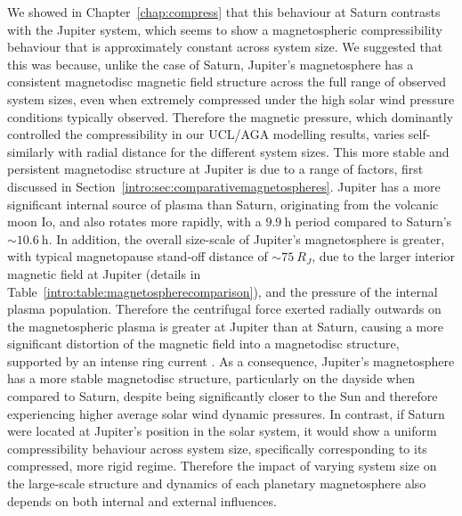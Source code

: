 We showed in Chapter~\ref{chap:compress} that this behaviour at Saturn contrasts with the Jupiter system, which seems to show a magnetospheric compressibility behaviour that is approximately constant across system size. We suggested that this was because, unlike the case of Saturn, Jupiter's magnetosphere has a consistent magnetodisc magnetic field structure across the full range of observed system sizes, even when extremely compressed under the high solar wind pressure conditions typically observed. Therefore the magnetic pressure, which dominantly controlled the compressibility in our UCL/AGA modelling results, varies self-similarly with radial distance for the different system sizes. This more stable and persistent magnetodisc structure at Jupiter is due to a range of factors, first discussed in Section~\ref{intro:sec:comparativemagnetospheres}. Jupiter has a more significant internal source of plasma than Saturn, originating from the volcanic moon Io, and also rotates more rapidly, with a $\SI{9.9}{\hour}$ period compared to Saturn's  ${\sim}\SI{10.6}{\hour}$. In addition, the overall size-scale of Jupiter's magnetosphere is  greater, with typical magnetopause stand-off distance of ${\sim}\SI{75}{R_J}$, due to the larger interior magnetic field at Jupiter (details in Table~\ref{intro:table:magnetospherecomparison}), and the pressure of the internal plasma population. Therefore the centrifugal force exerted radially outwards on the magnetospheric plasma is greater at Jupiter than at Saturn, causing a more significant distortion of the magnetic field into a magnetodisc structure, supported by an intense ring current \citep[e.g.][]{khurana2004}. As a consequence, Jupiter's magnetosphere has a more stable magnetodisc structure, particularly on the dayside when compared to Saturn, despite being significantly closer to the Sun and therefore experiencing higher average solar wind dynamic pressures. In contrast, if Saturn were located at Jupiter's position in the solar system, it would show a uniform compressibility behaviour across system size, specifically corresponding to its compressed, more rigid regime. Therefore the impact of varying system size on the large-scale structure and dynamics of each planetary magnetosphere also depends on both internal and external influences.

